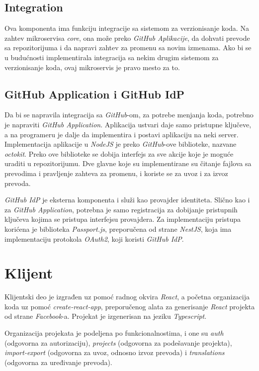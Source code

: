 \subsection{Integration}
Ova komponenta ima funkciju integracije sa sistemom za verzionisanje koda. 
Na zahtev mikroservisa \textit{core}, ona može preko \textit{GitHub Aplikacije}, 
da dohvati prevode sa repozitorijuma i da napravi zahtev za promenu sa 
novim izmenama. Ako bi se u budućnosti implementirala integracija sa nekim 
drugim sistemom za verzionisanje koda, ovaj mikroservis je pravo mesto za to.

\subsection{GitHub Application i GitHub IdP}
Da bi se napravila integracija sa \textit{GitHub}-om, za potrebe menjanja 
koda, potrebno je napraviti \textit{GitHub Application}. Aplikacija 
ustvari daje samo pristupne ključeve, a na programeru je dalje da implementira 
i postavi aplikaciju na neki server. Implementacija aplikacije u \textit{NodeJS} 
je preko \textit{GitHub}-ove biblioteke, nazvane \textit{octokit}. Preko ove 
biblioteke se dobija interfejs za sve akcije koje je moguće uraditi u 
repozitorijumu. Dve glavne koje su implementirane su čitanje fajlova sa 
prevodima i pravljenje zahteva za promenu, i koriste se za uvoz i za 
izvoz prevoda.

\textit{GitHub IdP} je eksterna komponenta i služi kao provajder identiteta. 
Slično kao i za \textit{GitHub Application}, potrebna je samo registracija 
za dobijanje pristupnih ključeva kojima se pristupa interfejsu provajdera. 
Za implementaciju pristupa korićena je biblioteka \textit{Passport.js}, 
preporučena od strane \textit{NestJS}, koja ima implementaciju 
protokola \textit{OAuth2}, koji koristi \textit{GitHub IdP}.

\section{Klijent}
Klijentski deo je izgrađen uz pomoć radnog okvira \textit{React}, a početna 
organizacija koda uz pomoć \textit{create-react-app}, preporučenog alata za 
generisanje \textit{React} projekta od strane \textit{Facebook}-a. 
Projekat je izgenerisan na jeziku \textit{Typescript}. 

Organizacija projekata je podeljena po funkcionalnostima, i one su 
\textit{auth} (odgovorna za autorizaciju), \textit{projects} (odgovorna za 
podešavanje projekta), \textit{import-export} (odgovorna za 
uvoz, odnosno izvoz prevoda) i \textit{translations} (odgovorna za uređivanje 
prevoda).

